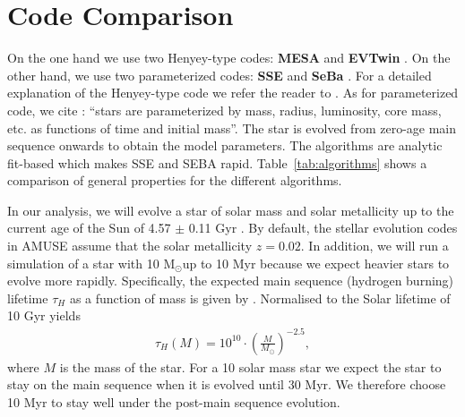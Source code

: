 \documentclass{aa}
\newcommand{\Sun}[0]{\ensuremath{_{\odot}}}
\begin{document}
\section{Code Comparison}\label{sec:algorithms}
On the one hand we use two Henyey-type codes: \textbf{MESA} \citep{2011ApJS..192....3P, 2013ApJS..208....4P} and \textbf{EVTwin} \citep{1971MNRAS.151..351E, 1972MNRAS.156..361E, 1973MNRAS.163..279E, 1973A&A....23..325E, 1994MNRAS.270..121H, 1995MNRAS.274..964P, 2001ASPC..229..157E, 2001ApJ...552..664N, 2002ApJ...575..461E, 2007A&A...464L..57S, 2004MNRAS.348..201E, 2008A&A...488.1007G}. On the other hand, we use two parameterized codes:  \textbf{SSE} \citep{2000MNRAS.315..543H} and \textbf{SeBa} \citep{1996A&A...309..179P, 2012A&A...546A..70T}. For a detailed explanation of the Henyey-type code we refer the reader to \cite{1959ApJ...129..628H}. As for parameterized code, we cite \cite{AMUSEdocumentation}: ``stars are parameterized by mass, radius, luminosity, core mass, etc. as functions of time and initial mass''. The star is evolved from zero-age main sequence onwards to obtain the model parameters. The algorithms are analytic fit-based which makes SSE and SEBA rapid. Table~\ref{tab:algorithms} shows a comparison of general properties for the different algorithms.

In our analysis, we will evolve a star of solar mass and solar metallicity up to the current age of the Sun of 4.57 $\pm$ 0.11 Gyr \citep{2002A&A...390.1115B}. By default, the stellar evolution codes in AMUSE assume that the solar metallicity $z = 0.02$.
In addition, we will run a simulation of a star with 10 M\Sun up to 10 Myr because we expect heavier stars to evolve more rapidly. Specifically, the expected main sequence (hydrogen burning) lifetime $\tau_H$ as a function of mass is given by \citep[][p. 347]{2012sse..book.....K}. Normalised to the Solar lifetime of 10 Gyr \citep{1993ApJ...418..457S} yields
\begin{eqnarray}
     \tau_H(M) = 10^{10} \cdot \left(\frac{M}{M\Sun}\right)^{-2.5},
\end{eqnarray} where $M$ is the mass of the star. For a 10 solar mass star we expect the star to stay on the main sequence when it is evolved until 30 Myr. We therefore choose 10 Myr to stay well under the post-main sequence evolution.
\end{document}
